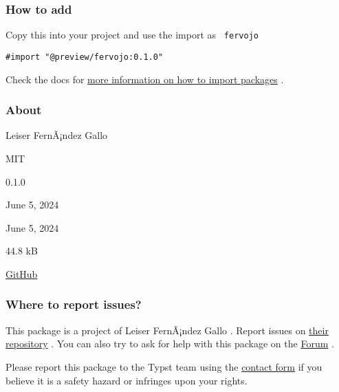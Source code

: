 \subsubsection{How to add}\label{how-to-add}

Copy this into your project and use the import as \texttt{\ fervojo\ }

\begin{verbatim}
#import "@preview/fervojo:0.1.0"
\end{verbatim}



Check the docs for
\href{https://typst.app/docs/reference/scripting/\#packages}{more
information on how to import packages} .

\subsubsection{About}\label{about}

\begin{description}
\tightlist
\item[Author :]
Leiser FernÃ¡ndez Gallo
\item[License:]
MIT
\item[Current version:]
0.1.0
\item[Last updated:]
June 5, 2024
\item[First released:]
June 5, 2024
\item[Archive size:]
44.8 kB
\href{https://packages.typst.org/preview/fervojo-0.1.0.tar.gz}{\pandocbounded{}}
\item[Repository:]
\href{https://github.com/leiserfg/fervojo}{GitHub}
\end{description}

\subsubsection{Where to report issues?}\label{where-to-report-issues}

This package is a project of Leiser FernÃ¡ndez Gallo . Report issues on
\href{https://github.com/leiserfg/fervojo}{their repository} . You can
also try to ask for help with this package on the
\href{https://forum.typst.app}{Forum} .

Please report this package to the Typst team using the
\href{https://typst.app/contact}{contact form} if you believe it is a
safety hazard or infringes upon your rights.

